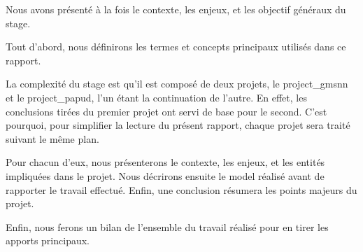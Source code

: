 
Nous avons présenté à la fois le contexte, les enjeux, et les objectif généraux du stage.

Tout d’abord, nous définirons les termes et concepts principaux utilisés dans ce rapport.

La complexité du stage est qu'il est composé de deux projets, le \gls{project_gmsnn} et le \gls{project_papud}, l'un étant la continuation de l'autre. En effet, les conclusions tirées du premier projet ont servi de base pour le second. C'est pourquoi, pour simplifier la lecture du présent rapport, chaque projet sera traité suivant le même plan.

Pour chacun d'eux, nous présenterons le contexte, les enjeux, et les entités impliquées dans le projet. Nous décrirons ensuite le \gls{model} réalisé avant de rapporter le travail effectué. Enfin, une conclusion résumera les points majeurs du projet.

Enfin, nous ferons un bilan de l'ensemble du travail réalisé pour en tirer les apports principaux.



